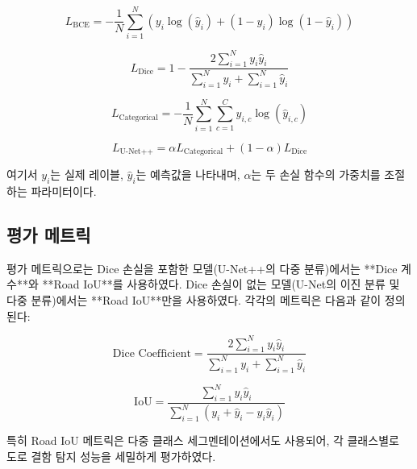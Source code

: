 \[
L_{\text{BCE}} = - \frac{1}{N} \sum_{i=1}^{N} \left( y_i \log(\hat{y}_i) + (1 - y_i) \log(1 - \hat{y}_i) \right)
\]

\[
L_{\text{Dice}} = 1 - \frac{2 \sum_{i=1}^{N} y_i \hat{y}_i}{\sum_{i=1}^{N} y_i + \sum_{i=1}^{N} \hat{y}_i}
\]

\[
L_{\text{Categorical}} = - \frac{1}{N} \sum_{i=1}^{N} \sum_{c=1}^{C} y_{i,c} \log(\hat{y}_{i,c})
\]

\[
L_{\text{U-Net++}} = \alpha L_{\text{Categorical}} + (1 - \alpha) L_{\text{Dice}}
\]

여기서 $y_i$는 실제 레이블, $\hat{y}_i$는 예측값을 나타내며, $\alpha$는 두 손실 함수의 가중치를 조절하는 파라미터이다.

\subsection{평가 메트릭}
평가 메트릭으로는 Dice 손실을 포함한 모델(U-Net++의 다중 분류)에서는 **Dice 계수**와 **Road IoU**를 사용하였다. Dice 손실이 없는 모델(U-Net의 이진 분류 및 다중 분류)에서는 **Road IoU**만을 사용하였다. 각각의 메트릭은 다음과 같이 정의된다:

\[
\text{Dice Coefficient} = \frac{2 \sum_{i=1}^{N} y_i \hat{y}_i}{\sum_{i=1}^{N} y_i + \sum_{i=1}^{N} \hat{y}_i}
\]

\[
\text{IoU} = \frac{\sum_{i=1}^{N} y_i \hat{y}_i}{\sum_{i=1}^{N} \left( y_i + \hat{y}_i - y_i \hat{y}_i \right)}
\]

특히 Road IoU 메트릭은 다중 클래스 세그멘테이션에서도 사용되어, 각 클래스별로 도로 결함 탐지 성능을 세밀하게 평가하였다.
